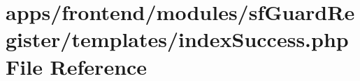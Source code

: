 \hypertarget{frontend_2modules_2sf_guard_register_2templates_2index_success_8php}{\section{apps/frontend/modules/sf\-Guard\-Register/templates/index\-Success.php File Reference}
\label{frontend_2modules_2sf_guard_register_2templates_2index_success_8php}
}
